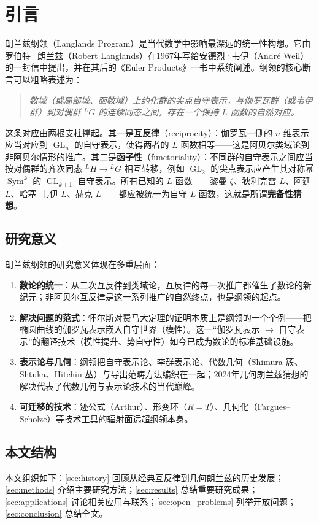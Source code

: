 \section{引言}\label{sec:introduction}

朗兰兹纲领（Langlands Program）是当代数学中影响最深远的统一性构想。它由罗伯特·朗兰兹（Robert Langlands）在1967年写给安德烈·韦伊（André Weil）的一封信中提出\cite{langlands1967}，并在其后的《Euler Products》一书中系统阐述\cite{langlands1971}。纲领的核心断言可以粗略表述为：

\begin{quote}
    \textit{数域（或局部域、函数域）上约化群的尖点自守表示，与伽罗瓦群（或韦伊群）到对偶群 $^LG$ 的连续同态之间，存在一个保持 $L$ 函数的自然对应。}
\end{quote}

这条对应由两根支柱撑起。其一是\textbf{互反律}（reciprocity）：伽罗瓦一侧的 $n$ 维表示应当对应到 $\operatorname{GL}_n$ 的自守表示，使得两者的 $L$ 函数相等——这是阿贝尔类域论到非阿贝尔情形的推广。其二是\textbf{函子性}（functoriality）：不同群的自守表示之间应当按对偶群的齐次同态 $^LH \to {}^LG$ 相互转移，例如 $\operatorname{GL}_2$ 的尖点表示应产生其对称幂 $\operatorname{Sym}^k$ 的 $\operatorname{GL}_{k+1}$ 自守表示。所有已知的 $L$ 函数——黎曼 $\zeta$、狄利克雷 $L$、阿廷 $L$、哈塞--韦伊 $L$、赫克 $L$——都应被统一为自守 $L$ 函数，这就是所谓\textbf{完备性猜想}。

\subsection{研究意义}

朗兰兹纲领的研究意义体现在多重层面：

\begin{enumerate}[label=(\arabic*)]
    \item \textbf{数论的统一}：从二次互反律到类域论，互反律的每一次推广都催生了数论的新纪元；非阿贝尔互反律是这一系列推广的自然终点，也是纲领的起点。
    \item \textbf{解决问题的范式}：怀尔斯对费马大定理的证明本质上是纲领的一个个例——把椭圆曲线的伽罗瓦表示嵌入自守世界（模性）。这一“伽罗瓦表示 $\to$ 自守表示”的翻译技术（模性提升、势自守性）如今已成为数论的标准基础设施\cite{blggt2014}。
    \item \textbf{表示论与几何}：纲领把自守表示论、李群表示论、代数几何（Shimura 簇、Shtuka、Hitchin 丛）与导出范畴方法编织在一起；2024年几何朗兰兹猜想的解决\cite{gaitsgoryraskin2024}代表了代数几何与表示论技术的当代巅峰。
    \item \textbf{可迁移的技术}：迹公式（Arthur）、形变环（$R=T$）、几何化（Fargues--Scholze\cite{fargues2021}）等技术工具的辐射面远超纲领本身。
\end{enumerate}

\subsection{本文结构}

本文组织如下：\cref{sec:history} 回顾从经典互反律到几何朗兰兹的历史发展；\cref{sec:methods} 介绍主要研究方法；\cref{sec:results} 总结重要研究成果；\cref{sec:applications} 讨论相关应用与联系；\cref{sec:open_problems} 列举开放问题；\cref{sec:conclusion} 总结全文。
